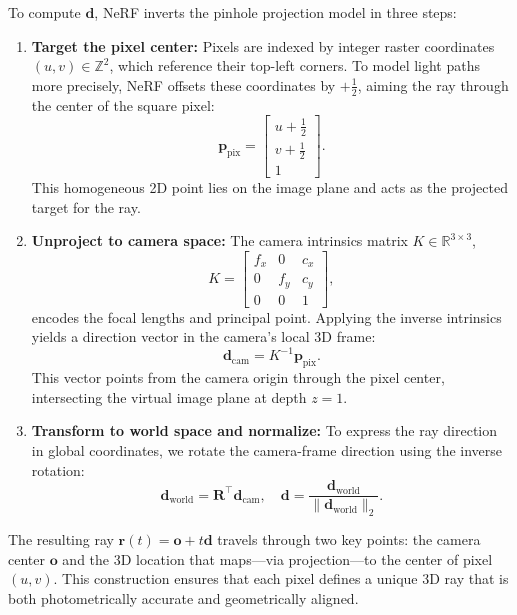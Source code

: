 \vspace{0.5em}
\noindent
To compute \( \mathbf{d} \), NeRF inverts the pinhole projection model in three steps:

\begin{enumerate}
    \item \textbf{Target the pixel center:}
    Pixels are indexed by integer raster coordinates \( (u, v) \in \mathbb{Z}^2 \), which reference their top-left corners. To model light paths more precisely, NeRF offsets these coordinates by \( +\tfrac{1}{2} \), aiming the ray through the center of the square pixel:
    \[
    \mathbf{p}_{\text{pix}} =
    \begin{bmatrix}
        u + \tfrac{1}{2} \\
        v + \tfrac{1}{2} \\
        1
    \end{bmatrix}.
    \]
    This homogeneous 2D point lies on the image plane and acts as the projected target for the ray.
    
    \item \textbf{Unproject to camera space:}
    The camera intrinsics matrix \( K \in \mathbb{R}^{3 \times 3} \),
    \[
    K =
    \begin{bmatrix}
        f_x & 0 & c_x \\
        0 & f_y & c_y \\
        0 & 0 & 1
    \end{bmatrix},
    \]
    encodes the focal lengths and principal point. Applying the inverse intrinsics yields a direction vector in the camera’s local 3D frame:
    \[
    \mathbf{d}_{\text{cam}} = K^{-1} \mathbf{p}_{\text{pix}}.
    \]
    This vector points from the camera origin through the pixel center, intersecting the virtual image plane at depth \( z = 1 \).
    
    \item \textbf{Transform to world space and normalize:}
    To express the ray direction in global coordinates, we rotate the camera-frame direction using the inverse rotation:
    \[
    \mathbf{d}_{\text{world}} = \mathbf{R}^\top \mathbf{d}_{\text{cam}}, \quad
    \mathbf{d} = \frac{\mathbf{d}_{\text{world}}}{\| \mathbf{d}_{\text{world}} \|_2}.
    \]
\end{enumerate}

\vspace{0.5em}
\noindent
The resulting ray \( \mathbf{r}(t) = \mathbf{o} + t\mathbf{d} \) travels through two key points: the camera center \( \mathbf{o} \) and the 3D location that maps—via projection—to the center of pixel \( (u, v) \). This construction ensures that each pixel defines a unique 3D ray that is both photometrically accurate and geometrically aligned.

